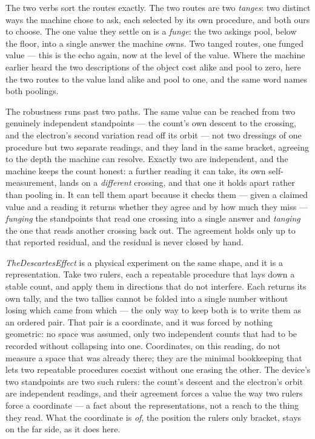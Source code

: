 The two verbs sort the routes exactly.
The two routes are two \emph{tanges}: two distinct ways the machine chose to ask, each selected by its own procedure,
and both ours to choose.
The one value they settle on is a \emph{funge}: the two askings pool, below the floor, into a single answer the machine
owns.
Two tanged routes, one funged value --- this is the echo again, now at the level of the value.
Where the machine earlier heard the two descriptions of the object cost alike and pool to zero, here the two routes to the value
land alike and pool to one, and the same word names both poolings.

The robustness runs past two paths.
The same value can be reached from two genuinely independent standpoints --- the count's own descent to the crossing, and
the electron's second variation read off its orbit --- not two dressings of one procedure but two separate readings, and
they land in the same bracket, agreeing to the depth the machine can resolve.
Exactly two are independent, and the machine keeps the count honest: a further reading it can take, its own
self-measurement, lands on a \emph{different} crossing, and that one it holds apart rather than pooling in.
It can tell them apart because it checks them --- given a claimed value and a reading it returns whether they agree and by
how much they miss --- \emph{funging} the standpoints that read one crossing into a single answer and \emph{tanging} the
one that reads another crossing back out.
The agreement holds only up to that reported residual, and the residual is never closed by hand.

\emph{TheDescartesEffect} is a physical experiment on the same shape, and it is a representation.
Take two rulers, each a repeatable procedure that lays down a stable count, and apply them in directions that do not
interfere.
Each returns its own tally, and the two tallies cannot be folded into a single number without losing which came from
which --- the only way to keep both is to write them as an ordered pair.
That pair is a coordinate, and it was forced by nothing geometric: no space was assumed, only two independent counts that
had to be recorded without collapsing into one.
Coordinates, on this reading, do not measure a space that was already there; they are the minimal bookkeeping that lets
two repeatable procedures coexist without one erasing the other.
The device's two standpoints are two such rulers: the count's descent and the electron's orbit are independent readings,
and their agreement forces a value the way two rulers force a coordinate --- a fact about the representations, not a reach
to the thing they read.
What the coordinate is \emph{of}, the position the rulers only bracket, stays on the far side, as it does here.

